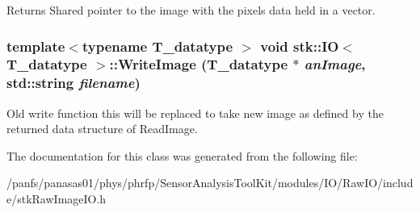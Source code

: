 \begin{DoxyReturn}{Returns}
Shared pointer to the image with the pixels data held in a vector. 
\end{DoxyReturn}
\hypertarget{classstk_1_1IO_a6318b4ae3772f8c8e38d094eceebe630}{
\subsubsection[{WriteImage}]{\setlength{\rightskip}{0pt plus 5cm}template$<$typename T\_\-datatype $>$ void {\bf stk::IO}$<$ T\_\-datatype $>$::WriteImage (T\_\-datatype $\ast$ {\em anImage}, \/  std::string {\em filename})}}
\label{classstk_1_1IO_a6318b4ae3772f8c8e38d094eceebe630}
Old write function this will be replaced to take new image as defined by the returned data structure of ReadImage. 

The documentation for this class was generated from the following file:\begin{DoxyCompactItemize}
\item 
/panfs/panasas01/phys/phrfp/SensorAnalysisToolKit/modules/IO/RawIO/include/stkRawImageIO.h\end{DoxyCompactItemize}
